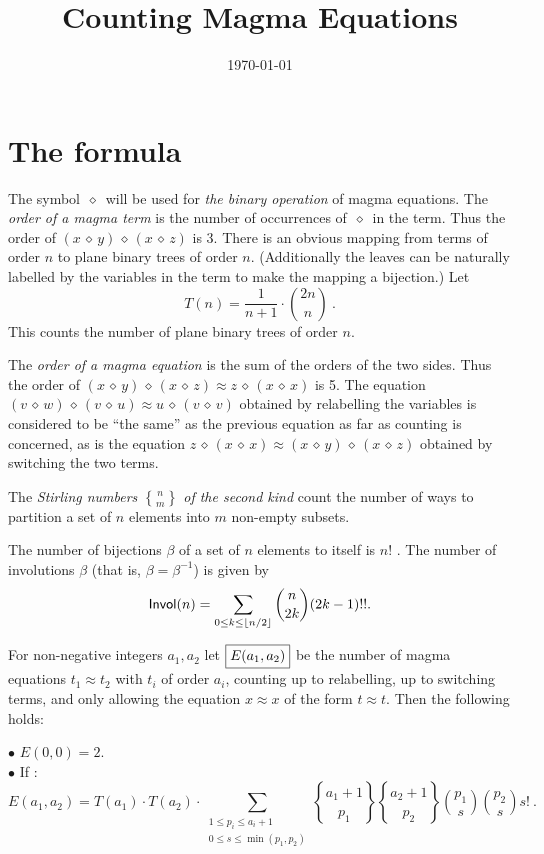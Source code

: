\documentclass[12pt]{amsart}
\title{Counting Magma Equations}
\date{\today}
\newcommand{\Invol}{{\sf Invol}}
\newcommand{\Dd}{{\,\diamond\,}}
\begin{document}
\maketitle

\section{The formula}
The symbol $\Dd$ will be used for {\it the binary operation} of magma equations. 
The {\it order of a magma term} is the number of occurrences of $\Dd$ in the term. 
Thus the order of $(x \Dd y) \Dd (x \Dd z)$ is 3. 
There is an obvious mapping from terms of order $n$ to plane binary trees of order $n$. 
(Additionally the leaves can be naturally labelled by the variables in the term to make the mapping a
bijection.)
Let
$$
T(n) = \frac{1}{n+1} \cdot {2n \choose n} \ .
$$
This counts the number of plane binary trees of order $n$.

The {\it order of a magma equation} is the sum of the orders of the two sides. 
Thus the order of $(x \Dd y)  \Dd (x \Dd z) \approx z  \Dd  (x  \Dd x)$ is 5. 
The equation $(v \Dd w)  \Dd (v \Dd u) \approx u  \Dd  (v  \Dd v)$ obtained by relabelling the variables is considered to be ``the same'' as the previous equation as far as counting is concerned, as is the equation 
$ z  \Dd  (x  \Dd x) \approx (x \Dd y)  \Dd (x \Dd z) $
obtained by switching the two terms. 

The {\it Stirling numbers $n \brace m$ of the second kind} count the number of ways to partition a set of $n$ elements into $m$ non-empty subsets.

The number of bijections $\beta$ of a set of $n$ elements to itself is $n!$ .
The number of involutions $\beta$ (that is, $\beta = \beta^{-1}$) is given by
$$
\Invol(n) = \sum_{0 \leq k \leq \lfloor n/2 \rfloor}  {n\choose 2k} (2k-1)!!.
$$

For non-negative integers $a_1, a_2$ let $\fbox{$E(a_1,a_2)$}$ be the number of magma equations 
$t_1 \approx t_2$ with $t_i$ of order $a_i$, counting up to relabelling, up to switching terms, and only allowing the equation $x\approx x$ of the form $t \approx t$. Then the following holds:

\pagebreak

$\bullet$ $E(0,0) = 2$.\\

$\bullet$ If : 
$$
E(a_1,a_2) = T(a_1)\cdot T(a_2)\cdot \sum_{\substack{1 \le p_i \le a_i+1\\0\le s \le \min(p_1,p_2)}} 
{a_1+1 \brace p_1} {a_2+1 \brace p_2} {p_1 \choose s} {p_2 \choose s} s! \ .
$$
\end{document}
